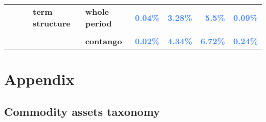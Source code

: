 \documentclass[
  authoryear,
  preprint,
  3p]{elsarticle}
\begin{document}
\begin{landscape}
\begin{longtable}[t]{>{}l>{}l>{}l>{}l>{}l>{}r>{}r>{}r>{}r}
\textbf{} & \textbf{} & \textbf{} & \textbf{term structure} & \textbf{whole period} & \textcolor[HTML]{4285f4}{\textbf{0.04\%}} & \textcolor[HTML]{4285f4}{\textbf{3.28\%}} & \textcolor[HTML]{4285f4}{\textbf{5.5\%}} & \textcolor[HTML]{4285f4}{\textbf{0.09\%}}\\
\textbf{\cellcolor{gray!10}{}} & \textbf{\cellcolor{gray!10}{}} & \textbf{\cellcolor{gray!10}{}} & \textbf{\cellcolor{gray!10}{}} & \textbf{\cellcolor{gray!10}{backwardation}} & \textcolor[HTML]{4285f4}{\textbf{\cellcolor{gray!10}{0.17\%}}} & \textcolor[HTML]{4285f4}{\textbf{\cellcolor{gray!10}{2.37\%}}} & \textcolor[HTML]{4285f4}{\textbf{\cellcolor{gray!10}{3.67\%}}} & \textcolor[HTML]{4285f4}{\textbf{\cellcolor{gray!10}{0.09\%}}}\\
\addlinespace
\textbf{} & \textbf{} & \textbf{} & \textbf{} & \textbf{contango} & \textcolor[HTML]{4285f4}{\textbf{0.02\%}} & \textcolor[HTML]{4285f4}{\textbf{4.34\%}} & \textcolor[HTML]{4285f4}{\textbf{6.72\%}} & \textcolor[HTML]{4285f4}{\textbf{0.24\%}}\\
\bottomrule

\end{longtable}

\endgroup{}
\end{landscape}

\newpage

\section{Appendix}\label{appendix}

\subsection{Commodity assets taxonomy}\label{sec-taxonomy}

\begingroup\fontsize{7}{9}\selectfont
\end{document}
